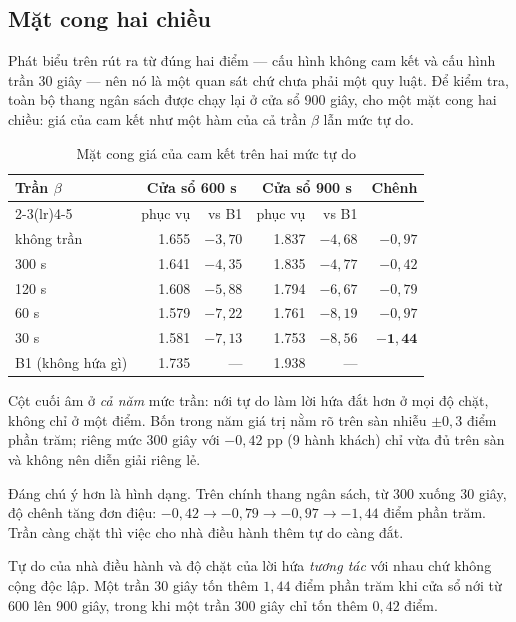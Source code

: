\subsection{Mặt cong hai chiều}
\label{muc:matcong}

Phát biểu trên rút ra từ đúng hai điểm --- cấu hình không cam kết và cấu hình trần 30 giây ---
nên nó là một quan sát chứ chưa phải một quy luật. Để kiểm tra, toàn bộ thang ngân sách được
chạy lại ở cửa sổ 900 giây, cho một mặt cong hai chiều: giá của cam kết như một hàm của cả trần
$\beta$ lẫn mức tự do.

\begin{table}[htbp]
\centering
\caption{Mặt cong giá của cam kết trên hai mức tự do}
\label{bang:matcong}
\small
\begin{tabular}{@{}lrrrrr@{}}
\toprule
\multirow{2}{*}{\textbf{Trần $\beta$}} & \multicolumn{2}{c}{\textbf{Cửa sổ 600 s}} & \multicolumn{2}{c}{\textbf{Cửa sổ 900 s}} & \multirow{2}{*}{\textbf{Chênh}}\\
\cmidrule(lr){2-3}\cmidrule(lr){4-5}
 & phục vụ & vs B1 & phục vụ & vs B1 & \\
\midrule
không trần & 1.655 & $-3{,}70$ & 1.837 & $-4{,}68$ & $-0{,}97$\\
300 s & 1.641 & $-4{,}35$ & 1.835 & $-4{,}77$ & $-0{,}42$\\
120 s & 1.608 & $-5{,}88$ & 1.794 & $-6{,}67$ & $-0{,}79$\\
60 s & 1.579 & $-7{,}22$ & 1.761 & $-8{,}19$ & $-0{,}97$\\
30 s & 1.581 & $-7{,}13$ & 1.753 & $-8{,}56$ & $\mathbf{-1{,}44}$\\
\midrule
B1 (không hứa gì) & 1.735 & --- & 1.938 & --- & \\
\bottomrule
\end{tabular}
\end{table}

Cột cuối âm ở \emph{cả năm} mức trần: nới tự do làm lời hứa đắt hơn ở mọi độ chặt, không chỉ ở
một điểm. Bốn trong năm giá trị nằm rõ trên sàn nhiễu $\pm 0{,}3$ điểm phần trăm; riêng mức
300 giây với $-0{,}42$ pp (9 hành khách) chỉ vừa đủ trên sàn và không nên diễn giải riêng lẻ.

Đáng chú ý hơn là hình dạng. Trên chính thang ngân sách, từ 300 xuống 30 giây, độ chênh tăng
đơn điệu: $-0{,}42 \to -0{,}79 \to -0{,}97 \to -1{,}44$ điểm phần trăm. Trần càng chặt thì việc
cho nhà điều hành thêm tự do càng đắt.

\begin{khungy}
Tự do của nhà điều hành và độ chặt của lời hứa \emph{tương tác} với nhau chứ không cộng độc
lập. Một trần 30 giây tốn thêm $1{,}44$ điểm phần trăm khi cửa sổ nới từ 600 lên 900 giây,
trong khi một trần 300 giây chỉ tốn thêm $0{,}42$ điểm.
\end{khungy}

